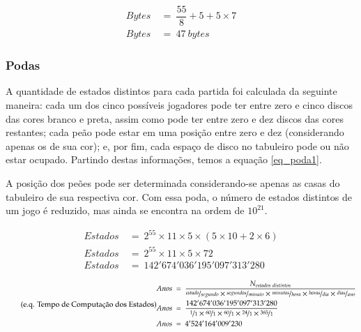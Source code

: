 \begin{equation} \label{eq_bytes} \tag{e.q. Bytes na memória}
\begin{split}
Bytes\ &=\ \dfrac{55}{8} + 5 + 5\times 7\\
Bytes\ &=\ 47\ bytes
\end{split}
\end{equation}

\subsubsection{Podas}

A quantidade de estados distintos para cada partida foi calculada da seguinte maneira: cada um dos cinco possíveis jogadores pode ter entre zero e cinco discos das cores branco e preta, assim como pode ter entre zero e dez discos das cores restantes; cada peão pode estar em uma posição entre zero e dez (considerando apenas os de sua cor); e, por fim, cada espaço de disco no tabuleiro pode ou não estar ocupado. Partindo destas informações, temos a equação \ref{eq_poda1}.

A posição dos peões pode ser determinada considerando-se apenas as casas do
tabuleiro de sua respectiva cor. Com essa poda, o número de estados distintos
de um jogo é reduzido, mas ainda se encontra na ordem de $10^{21}$.

\begin{equation} \label{eq_poda1} \tag{e.q. Poda por posição}
\begin{split}
Estados\ &=\ 2^{55}\times 11\times 5\times (5\times 10 + 2\times 6)\\
Estados\ &=\ 2^{55}\times 11\times 5\times 72\\
Estados\ &=\ 142'674'036'195'097'313'280
\end{split}
\end{equation}

\begin{equation} \label{eq_anos_estados} \tag{e.q. Tempo de Computação dos Estados}
\begin{split}
Anos\ &=\ \dfrac{N_{estados\ distintos}}{\nicefrac{estado}{segundo}\times\nicefrac{segundos}{minuto}\times\nicefrac{minutos}{hora}\times\nicefrac{horas}{dia}\times\nicefrac{dias}{ano}}\\
Anos\ &=\ \dfrac{142'674'036'195'097'313'280}{\nicefrac{1}{1}\times\nicefrac{60}{1}\times\nicefrac{60}{1}\times\nicefrac{24}{1}\times\nicefrac{365}{1}}\\
Anos\ &=\ 4'524'164'009'230
\end{split}
\end{equation}




